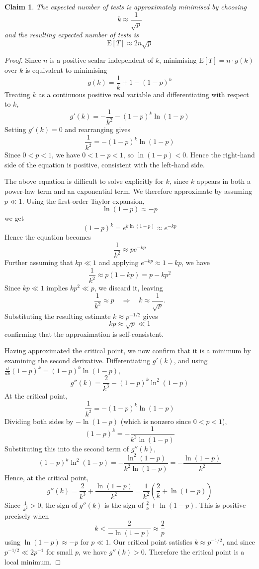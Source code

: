 \documentclass{article}
\newtheorem{claim}{Claim}
\begin{document}
\begin{claim}
    The expected number of tests is approximately minimised by choosing 
    \[
    k \approx \frac{1}{\sqrt{p}}
    \]
    and the resulting expected number of tests is 
    \[
    \mathrm{E}[T] \approx 2n\sqrt{p}
    \]
\end{claim}

\begin{proof}
    Since $n$ is a positive scalar independent of $k$, minimising $\mathrm{E}[T] = n \cdot g(k)$ over $k$ is 
    equivalent to minimising
    \[
    g(k) = \frac{1}{k} + 1 - (1-p)^k
    \]
    Treating $k$ as a continuous positive real variable and differentiating with respect to $k$,
    \[
    g'(k) = -\frac{1}{k^2} - (1-p)^k \ln(1-p)
    \]
    Setting $g'(k) = 0$ and rearranging gives
    \[
    \frac{1}{k^2} = -(1-p)^k \ln(1-p)
    \]
    Since $0 < p < 1$, we have $0 < 1-p < 1$, so $\ln(1-p) < 0$. Hence the right-hand side of the equation is
    positive, consistent with the left-hand side.

    \medskip

    The above equation is difficult to solve explicitly for $k$, since $k$ appears in both a power-law term 
    and an exponential term. We therefore approximate by assuming $p \ll 1$. Using the first-order Taylor 
    expansion,
    \[
    \ln(1-p) \approx -p
    \]
    we get
    \[
    (1-p)^k = e^{k\ln(1-p)} \approx e^{-kp}
    \]
    Hence the equation becomes 
    \[
    \frac{1}{k^2} \approx pe^{-kp}
    \]
    Further assuming that $kp \ll 1$ and applying $e^{-kp} \approx 1 - kp$, we have 
    \[
    \frac{1}{k^2} \approx p(1 - kp) = p - kp^2
    \]
    Since $kp \ll 1$ implies $kp^2 \ll p$, we discard it, leaving 
    \[
    \frac{1}{k^2} \approx p \quad \Longrightarrow \quad k \approx \frac{1}{\sqrt{p}}.
    \]
    Substituting the resulting estimate $k \approx p^{-1/2}$ gives
    \[
    kp \approx \sqrt{p} \ll 1
    \]
    confirming that the approximation is self-consistent.

    \medskip

    Having approximated the critical point, we now confirm that it is a minimum by examining the second 
    derivative. Differentiating $g'(k)$, and using $\frac{d}{dk}(1-p)^k = (1-p)^k\ln(1-p)$,
    \[
    g''(k) = \frac{2}{k^3} - (1-p)^k\ln^2(1-p)
    \]
    At the critical point,
    \[
    \frac{1}{k^2} = -(1-p)^k\ln(1-p)
    \]
    Dividing both sides by $-\ln(1-p)$ (which is nonzero since $0 < p < 1$),
    \[
    (1-p)^k = -\frac{1}{k^2\ln(1-p)}
    \]
    Substituting this into the second term of $g''(k)$, 
    \[
    (1-p)^k \ln^2(1-p) = -\frac{\ln^2(1-p)}{k^2\ln(1-p)} = -\frac{\ln(1-p)}{k^2}
    \]
    Hence, at the critical point,
    \[
    g''(k) = \frac{2}{k^3} + \frac{\ln(1-p)}{k^2} = \frac{1}{k^2}\left(\frac{2}{k} + \ln(1-p)\right)
    \]
    Since $\frac{1}{k^2} > 0$, the sign of $g''(k)$ is the sign of $\frac{2}{k} + \ln(1-p)$. This is positive 
    precisely when
    \[
    k < \frac{2}{-\ln(1-p)} \approx \frac{2}{p}
    \]
    using $\ln(1-p) \approx -p$ for $p \ll 1$. Our critical point satisfies $k \approx p^{-1/2}$, and since 
    $p^{-1/2} \ll 2p^{-1}$ for small $p$, we have $g''(k) > 0$. Therefore the critical point is a local 
    minimum.


\end{proof}
\end{document}
